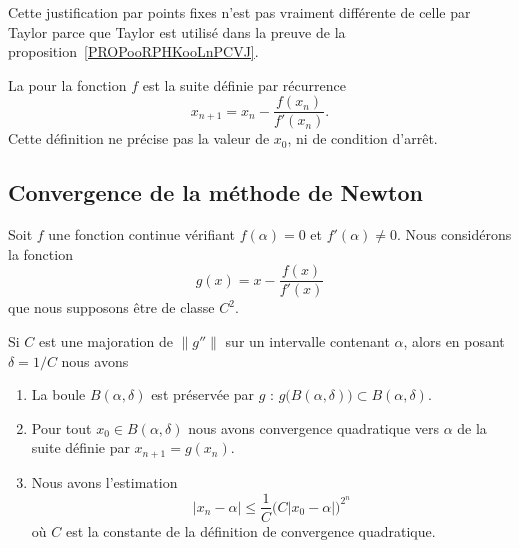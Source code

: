 \begin{remark}
	Cette justification par points fixes n'est pas vraiment différente de celle par Taylor parce que Taylor est utilisé dans la preuve de la proposition~\ref{PROPooRPHKooLnPCVJ}.
\end{remark}

\begin{definition}
	La  pour la fonction \( f\) est la suite définie par récurrence
	\begin{equation}
		x_{n+1}=x_n-\frac{ f(x_n)  }{ f'(x_n) }.
	\end{equation}
	Cette définition ne précise pas la valeur de \( x_0\), ni de condition d'arrêt.
\end{definition}

\subsection{Convergence de la méthode de Newton}

\begin{theorem}       \label{THOooDOVSooWsAFkx}
	Soit \( f\) une fonction continue vérifiant \( f(\alpha)=0\) et \( f'(\alpha)\neq 0\). Nous considérons la fonction
	\begin{equation}
		g(x)=x-\frac{ f(x) }{ f'(x) }
	\end{equation}
	que nous supposons être de classe \( C^2\).

	Si \( C\) est une majoration de \( \| g'' \|\) sur un intervalle contenant \( \alpha\), alors en posant \( \delta=1/C\) nous avons
	\begin{enumerate}
		\item       \label{ITEMooVXSKooWCVWQc}
		      La boule \( B(\alpha,\delta)\) est préservée par \( g\) : \( g\big( B(\alpha,\delta) \big)\subset B(\alpha,\delta)\).
		\item       \label{ITEMooZPSXooGgbfhG}
		      Pour tout \( x_0\in B(\alpha,\delta)\) nous avons convergence quadratique vers \( \alpha\) de la suite définie par \( x_{n+1}=g(x_n)\).
		\item       \label{ITEMooZCXZooCjeWPl}
		      Nous avons l'estimation
		      \begin{equation}        \label{EQooFAIPooDpoNWK}
			      | x_n-\alpha |\leq \frac{1}{ C }\big( C| x_0-\alpha | \big)^{2^n}
		      \end{equation}
		      où \( C\) est la constante de la définition de convergence quadratique.
	\end{enumerate}
\end{theorem}

